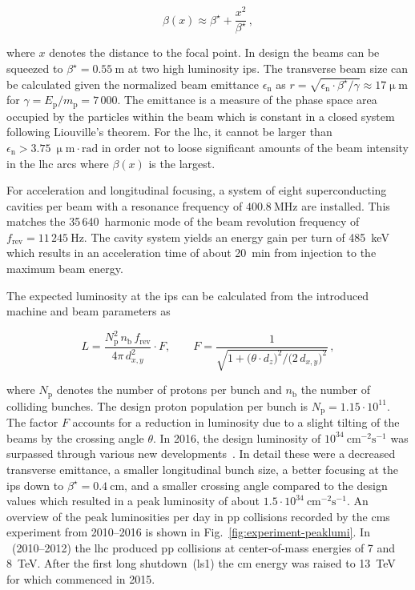 \begin{equation}
\beta(x)\approx\beta^\star+\frac{x^2}{\beta^\star}\,,
\end{equation}

where $x$ denotes the distance to the focal point. In design the beams can be squeezed to $\beta^\star=0.55~\mathrm{m}$ at two high luminosity \glspl{ip}. The transverse beam size can be calculated given the normalized beam emittance $\epsilon_\mathrm{n}$ as $r=\sqrt{\epsilon_\mathrm{n}\cdot\beta^\star/\gamma}\approx17\upmu\mathrm{m}$ for $\gamma=E_\mathrm{p}/m_\mathrm{p}=7\,000$. The emittance is a measure of the phase space area occupied by the particles within the beam which is constant in a closed system following Liouville's theorem. For the \gls{lhc}, it cannot be larger than $\epsilon_\mathrm{n}>3.75~\upmu\mathrm{m}\cdot\mathrm{rad}$ in order not to loose significant amounts of the beam intensity in the \gls{lhc} arcs where $\beta(x)$ is the largest.

For acceleration and longitudinal focusing, a system of eight superconducting cavities per beam with a resonance frequency of $400.8~\mathrm{MHz}$ are installed. This matches the 35\,640~harmonic mode of the beam revolution frequency of $f_\mathrm{rev}=11\,245~\mathrm{Hz}$. The cavity system yields an energy gain per turn of 485~keV which results in an acceleration time of about 20~min from injection to the maximum beam energy.

The expected luminosity at the \glspl{ip} can be calculated from the introduced machine and beam parameters as

\begin{equation}
L=\frac{N_\mathrm{p}^{2}\,n_\mathrm{b}\,f_\mathrm{rev}}{4\pi\,d^2_{x,y}}\cdot F,\qquad F=\frac{1}{\sqrt{1+\big(\theta\cdot d_{z}\big)^2\big/\big({2\,d_{x,y}}\big)^2}}\,,
\end{equation}

where $N_\mathrm{p}$ denotes the number of protons per bunch and $n_\mathrm{b}$ the number of colliding bunches. The design proton population per bunch is $N_\mathrm{p}=1.15\cdot10^{11}$. The factor $F$ accounts for a reduction in luminosity due to a slight tilting of the beams by the crossing angle $\theta$. In 2016, the design luminosity of $10^{34}~\mathrm{cm}^{-2}\mathrm{s}^{-1}$ was surpassed through various new developments~\cite{Team:2229040}. In detail these were a decreased transverse emittance, a smaller longitudinal bunch size, a better focusing at the \glspl{ip} down to $\beta^\star=0.4~\mathrm{cm}$, and a smaller crossing angle compared to the design values which resulted in a peak luminosity of about $1.5\cdot 10^{34}~\mathrm{cm}^{-2}\mathrm{s}^{-1}$. An overview of the peak luminosities per day in \gls{pp} collisions recorded by the \gls{cms} experiment from 2010--2016 is shown in Fig.~\ref{fig:experiment-peaklumi}. In ~(2010--2012) the \gls{lhc} produced \gls{pp} collisions at center-of-mass energies of 7 and 8~TeV. After the first long shutdown~(\gls{ls1}) the \acrlong{cm} energy was raised to 13~TeV for  which commenced in 2015.


